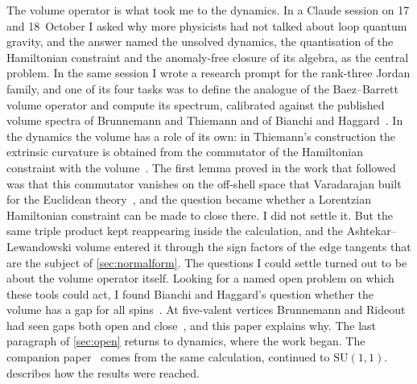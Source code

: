 The volume operator is what took me to the dynamics. In a Claude session on 17 and
18~October I asked why more physicists had not talked about loop quantum gravity, and the
answer named the unsolved dynamics, the quantisation of the Hamiltonian constraint and the
anomaly-free closure of its algebra, as the central problem. In the same session I wrote
a research prompt for the rank-three Jordan family, and one of its four tasks was to define the
analogue of the Baez--Barrett volume operator and compute its spectrum, calibrated against
the published volume spectra of Brunnemann and Thiemann and of Bianchi and
Haggard~\cite{BT2006,BH2011}. In the dynamics the volume has a role of its own: in
Thiemann's construction the extrinsic curvature is obtained from the commutator of the
Hamiltonian constraint with the volume~\cite{ThiemannQSD}. The first lemma proved in the
work that followed was that this commutator vanishes on the off-shell space that Varadarajan
built for the Euclidean theory~\cite{Varadarajan2022}, and the question became whether a
Lorentzian Hamiltonian constraint can be made to close there. I did not settle it. But the
same triple product kept reappearing inside the calculation, and the Ashtekar--Lewandowski
volume entered it through the sign factors of the edge tangents that are the subject of
\cref{sec:normalform}. The questions I could settle turned out to be about the volume
operator itself. Looking for a named open problem on which these tools could act, I found
Bianchi and Haggard's question whether the volume has a gap for all spins~\cite{BH2011}.
At five-valent vertices Brunnemann and Rideout had seen gaps both open and
close~\cite{BR2008a}, and this paper explains why. The last paragraph of \cref{sec:open}
returns to dynamics, where the work began. The companion paper~\cite{FitchLimitCircle}
comes from the same calculation, continued to $\mathrm{SU}(1,1)$. 
describes how the results were reached.

